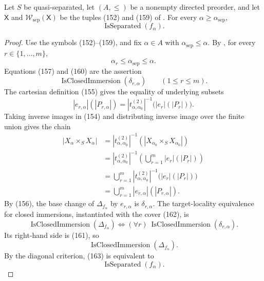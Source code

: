 \begin{lemma}
  \label{lemma:nagata-fixed-base-separated-eventually}

  Let $S$ be quasi-separated, let $(A,\leq)$ be a nonempty directed
  preorder, and let $\mathsf X$ and
  $\mathcal W_{\mathrm{sep}}(\mathsf X)$ be the tuples (152) and (159) of
  .  For every
  $\alpha\geq\alpha_{\mathrm{sep}}$,
  \[
    \operatorname{IsSeparated}(f_\alpha).
  \]
\end{lemma}

\begin{proof}
  Use the symbols (152)--(159), and fix
  $\alpha\in A$ with $\alpha_{\mathrm{sep}}\leq\alpha$.  By
  , for every
  $r\in\{1,\ldots,m\}$,
  \[
    \alpha_r\leq\alpha_{\mathrm{sep}}\leq\alpha.                 \tag{160}
  \]
  Equations (157) and (160) are the assertion
  \[
    \operatorname{IsClosedImmersion}(\delta_{r,\alpha})
      \qquad(1\leq r\leq m).
                                                                    \tag{161}
  \]
  The cartesian definition (155) gives the equality of underlying subsets
  \[
    |e_{r,\alpha}|(|P_{r,\alpha}|)
      =|t^{(2)}_{\alpha,\alpha_0}|^{-1}\bigl(|e_r|(|P_r|)\bigr).
  \]
  Taking inverse images in (154) and distributing inverse image over the
  finite union gives the chain
  \[
  \begin{aligned}
    |X_\alpha\times_SX_\alpha|
      &=|t^{(2)}_{\alpha,\alpha_0}|^{-1}
          \left(\left|X_{\alpha_0}\times_SX_{\alpha_0}\right|\right)\\
      &=|t^{(2)}_{\alpha,\alpha_0}|^{-1}
          \left(\bigcup_{r=1}^m|e_r|(|P_r|)\right)\\
      &=\bigcup_{r=1}^m
          |t^{(2)}_{\alpha,\alpha_0}|^{-1}\bigl(|e_r|(|P_r|)\bigr)\\
      &=\bigcup_{r=1}^m|e_{r,\alpha}|(|P_{r,\alpha}|).
  \end{aligned}                                                   \tag{162}
  \]
  By (156), the base change of $\Delta_{f_\alpha}$ by
  $e_{r,\alpha}$ is $\delta_{r,\alpha}$.  The target-locality equivalence for
  closed immersions, instantiated with the cover (162), is
  \[
    \operatorname{IsClosedImmersion}(\Delta_{f_\alpha})
      \Longleftrightarrow
    (\forall r)\ \operatorname{IsClosedImmersion}(\delta_{r,\alpha}).
  \]
  Its right-hand side is (161), so
  \[
    \operatorname{IsClosedImmersion}(\Delta_{f_\alpha}).          \tag{163}
  \]
  By the diagonal criterion, (163) is equivalent to
  \[
    \operatorname{IsSeparated}(f_\alpha).
  \]
\end{proof}

